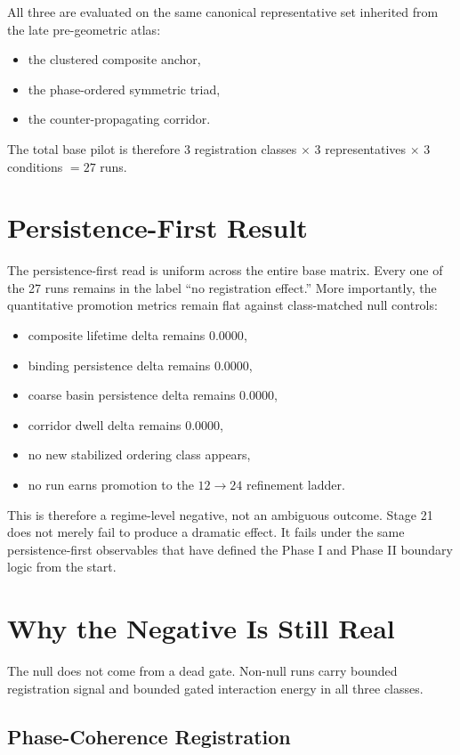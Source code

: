 \documentclass[11pt]{article}
\begin{document}
All three are evaluated on the same canonical representative set inherited from the late pre-geometric atlas:
\begin{itemize}
\item the clustered composite anchor,
\item the phase-ordered symmetric triad,
\item the counter-propagating corridor.
\end{itemize}
The total base pilot is therefore $3$ registration classes $\times$ $3$ representatives $\times$ $3$ conditions $=27$ runs.

\section{Persistence-First Result}

The persistence-first read is uniform across the entire base matrix. Every one of the 27 runs remains in the label ``no registration effect.'' More importantly, the quantitative promotion metrics remain flat against class-matched null controls:
\begin{itemize}
\item composite lifetime delta remains $0.0000$,
\item binding persistence delta remains $0.0000$,
\item coarse basin persistence delta remains $0.0000$,
\item corridor dwell delta remains $0.0000$,
\item no new stabilized ordering class appears,
\item no run earns promotion to the $12\rightarrow24$ refinement ladder.
\end{itemize}

This is therefore a regime-level negative, not an ambiguous outcome. Stage 21 does not merely fail to produce a dramatic effect. It fails under the same persistence-first observables that have defined the Phase I and Phase II boundary logic from the start.

\section{Why the Negative Is Still Real}

The null does not come from a dead gate. Non-null runs carry bounded registration signal and bounded gated interaction energy in all three classes.

\subsection{Phase-Coherence Registration}
\end{document}
